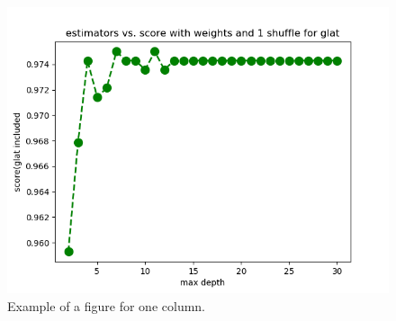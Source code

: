\begin{figure}[h]
\includegraphics[width=\onepic\textwidth]{plots/Rf_maxdepth_oobscore_glat}
\caption{
Example of a figure for one column.
}
\label{fig:Maps_data}
\end{figure}


